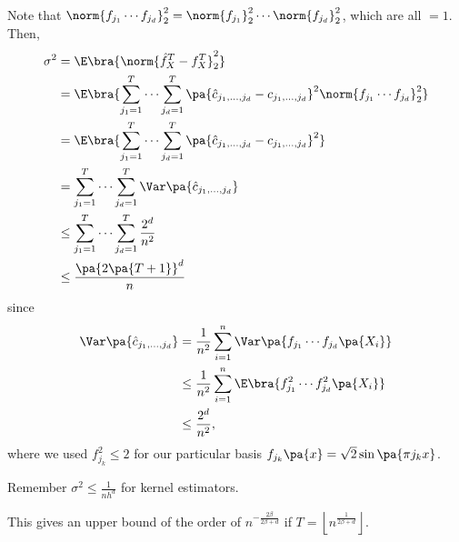 \begin{enumerate}
Note that $\norm{f_{j_1}\cdots f_{j_d}}_2^2 = \norm{f_{j_1}}_2^2 \cdots \norm{f_{j_d}}_2^2$, which are all $=1$. Then,
\begin{equation}
\begin{split}
  \sigma^2 &= \E\bra{ \norm{\hat{f}_X^T - f_X^T}_2^2}\\
   &= \E\bra{\sum_{j_1=1}^T \cdots \sum_{j_d=1}^T \pa{\hat{c}_{j_1,\ldots,j_d} - c_{j_1,\ldots, j_d}}^2\norm{f_{j_1}\cdots f_{j_d}}^2_2 }\\
   &= \E\bra{\sum_{j_1=1}^T \cdots \sum_{j_d=1}^T \pa{\hat{c}_{j_1,\ldots,j_d} - c_{j_1,\ldots, j_d}}^2} \\
  &= \sum_{j_1=1}^T \cdots \sum_{j_d=1}^T \Var\pa{\hat c_{j_1,...,j_d}}   \\
  &\leq \sum_{j_1=1}^T \cdots \sum_{j_d=1}^T \frac{2^d}{n^2}\\
  &\leq \frac{\pa{2 \pa{T+1} }^d }{n}
\end{split}
\end{equation}
since
\begin{equation}
\begin{split}
  \Var\pa{\hat c_{j_1,...,j_d}} &= \frac{1}{n^2} \sum_{i=1}^n \Var \pa{f_{j_1} \cdots f_{j_d} \pa{X_i}} \\
  &\leq \frac{1}{n^2} \sum_{i=1}^n \E \bra{f_{j_1}^2 \cdots f_{j_d}^2 \pa{X_i}}\\
  &\leq \frac{2^d}{n^2},
  \end{split}
\end{equation}
where we used $f_{j_k}^2 \leq 2$ for our particular basis $f_{j_k}\pa{x} = \sqrt{2}\sin\pa{\pi j_k x}$.

Remember $\sigma^2 \leq \frac{1}{nh^d}$ for kernel estimators.

This gives an upper bound of the order of $n^{-\frac{2\beta}{2\beta +d }}$ if $T = \left\lfloor n^{\frac{1}{2\beta + d}}\right\rfloor$.
\end{enumerate}
